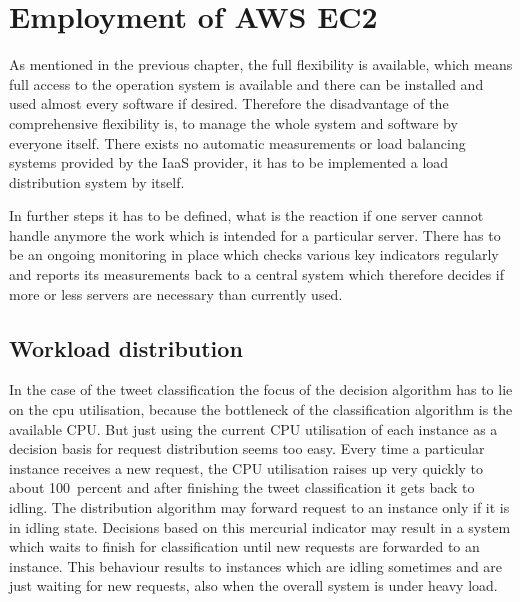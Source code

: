 \section{Employment of AWS EC2}
As mentioned in the previous chapter, the full flexibility is available, which means full access to the operation system is available and there can be installed and used almost every software if desired. Therefore the disadvantage of the comprehensive flexibility is, to manage the whole system and software by everyone itself. There exists no automatic measurements or load balancing systems provided by the IaaS provider, it has to be implemented a load distribution system by itself. 

In further steps it has to be defined, what is the reaction if one server cannot handle anymore the work which is intended for a particular server. There has to be an ongoing monitoring in place which checks various key indicators regularly and reports its measurements back to a central system which therefore decides if more or less servers are necessary than currently used.



\subsection{Workload distribution}
In the case of the tweet classification the focus of the decision algorithm has to lie on the cpu utilisation, because the bottleneck of the classification algorithm is the available CPU. But just using the current CPU utilisation of each instance as a decision basis for request distribution seems too easy. Every time a particular instance receives a new request, the CPU utilisation raises up very quickly to about 100~percent and after finishing the tweet classification it gets back to idling. The distribution algorithm may forward request to an instance only if it is in idling state. Decisions based on this mercurial indicator may result in a system which waits to finish for classification until new requests are forwarded to an instance. This behaviour results to instances which are idling sometimes and are just waiting for new requests, also when the overall system is under heavy load. 

